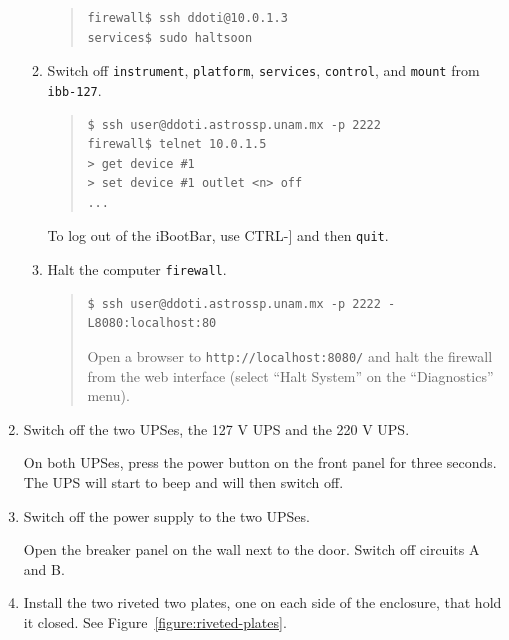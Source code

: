 \begin{enumerate}
\begin{enumerate}
\begin{quote}\footnotesize
\begin{verbatim}
firewall$ ssh ddoti@10.0.1.3
services$ sudo haltsoon
\end{verbatim}
\end{quote}

    \item Switch off \verb|instrument|, \verb|platform|, \verb|services|, \verb|control|, and \verb|mount| from \verb|ibb-127|.

\begin{quote}\footnotesize
\begin{verbatim}
$ ssh user@ddoti.astrossp.unam.mx -p 2222
firewall$ telnet 10.0.1.5
> get device #1
> set device #1 outlet <n> off
...
\end{verbatim}
\end{quote}
To log out of the iBootBar, use CTRL-] and then \verb|quit|.
    \item Halt the computer \verb|firewall|.

\begin{quote}\footnotesize
\begin{verbatim}
$ ssh user@ddoti.astrossp.unam.mx -p 2222 -L8080:localhost:80
\end{verbatim}

Open a browser to \verb|http://localhost:8080/| and halt the firewall from the web interface (select “Halt System” on the “Diagnostics” menu).
\end{quote}

\end{enumerate}

\item Switch off the two UPSes, the 127 V UPS and the 220 V UPS.

On both UPSes, press the power button on the front panel for three seconds. The UPS will start to beep and will then switch off.

\item Switch off the power supply to the two UPSes.

Open the breaker panel on the wall next to the door. Switch off circuits A and B.

\item
Install the two riveted two plates, one on each side of the enclosure, that hold it closed. See Figure~\ref{figure:riveted-plates}.


\end{enumerate}
